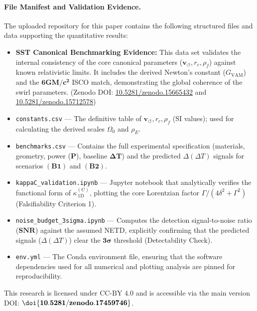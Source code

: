 \documentclass[aps,prb,preprint,amsmath,amssymb]{revtex4-2} %
\begin{document}
        \paragraph*{File Manifest and Validation Evidence.}
            The uploaded repository for this paper contains the following structured files and data supporting the quantitative results:
            \begin{itemize}
                \item \textbf{SST Canonical Benchmarking Evidence:} This data set validates the internal consistency of the core canonical parameters ($\mathbf{v}_{\!\boldsymbol{\circlearrowleft}}, r_c, \rho_{\!f}$) against known relativistic limits. It includes the derived Newton's constant ($G_{\mathrm{VAM}}$) and the $\mathbf{6GM/c^2}$ ISCO match, demonstrating the global coherence of the swirl parameters. \newline (Zenodo DOI: \url{10.5281/zenodo.15665432} and \url{10.5281/zenodo.15712578})

                \item \texttt{constants.csv} — The definitive table of $\mathbf{v}_{\!\boldsymbol{\circlearrowleft}}, r_c, \rho_{\!f}$ (SI values); used for calculating the derived scales $\Omega_0$ and $\rho_{\!E}$.
                \item \texttt{benchmarks.csv} — Contains the full experimental specification (materials, geometry, power ($\mathbf{P}$), baseline $\mathbf{\Delta T}$) and the predicted $\Delta(\Delta T)$ signals for scenarios $\mathbf{(B1)}$ and $\mathbf{(B2)}$.
                \item \texttt{kappaC\_validation.ipynb} — Jupyter notebook that analytically verifies the functional form of $\kappa^{(\mathrm C)}_{\!\,1\mathrm D}$, plotting the core Lorentzian factor $\Gamma/(4\delta^2+\Gamma^2)$ (Falsifiability Criterion 1).
                \item \texttt{noise\_budget\_3sigma.ipynb} — Computes the detection signal-to-noise ratio ($\mathbf{SNR}$) against the assumed NETD, explicitly confirming that the predicted signals ($\Delta(\Delta T)$) clear the $\mathbf{3\sigma}$ threshold (Detectability Check).
                \item \texttt{env.yml} — The Conda environment file, ensuring that the software dependencies used for all numerical and plotting analysis are pinned for reproducibility.
            \end{itemize}
            This research is licensed under $\text{CC-BY 4.0}$ and is accessible via the main version DOI: $\mathbf{\doi{\paperdoi}}$.
\end{document}
